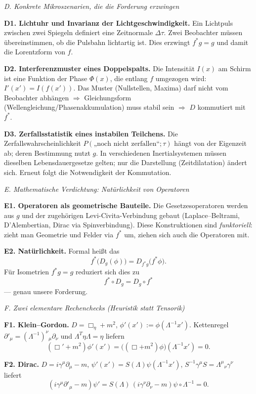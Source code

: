 \documentclass[10pt, letterpaper]{article}
\begin{document}
\bigskip
\emph{D. Konkrete Mikroszenarien, die die Forderung erzwingen}

\textbf{D1. Lichtuhr und Invarianz der Lichtgeschwindigkeit.}
Ein Lichtpuls zwischen zwei Spiegeln definiert eine Zeitnormale $\Delta\tau$. 
Zwei Beobachter müssen übereinstimmen, ob die Pulsbahn lichtartig ist. 
Dies erzwingt $f^*g=g$ und damit die Lorentzform von $f$.

\textbf{D2. Interferenzmuster eines Doppelspalts.}
Die Intensität $I(x)$ am Schirm ist eine Funktion der Phase $\Phi(x)$, die entlang $f$ umgezogen wird:
$I'(x')=I(f(x'))$. 
Das Muster (Nullstellen, Maxima) darf nicht vom Beobachter abhängen $\Rightarrow$ 
Gleichungsform (Wellengleichung/Phasenakkumulation) muss stabil sein $\Rightarrow$ 
$D$ kommutiert mit $f^*$.

\textbf{D3. Zerfallsstatistik eines instabilen Teilchens.}
Die Zerfallswahrscheinlichkeit $P(\text{„noch nicht zerfallen“};\tau)$ hängt von der Eigenzeit ab; 
deren Bestimmung nutzt $g$. 
In verschiedenen Inertialsystemen müssen dieselben Lebensdauergesetze gelten; 
nur die Darstellung (Zeitdilatation) ändert sich. 
Erneut folgt die Notwendigkeit der Kommutation.

\bigskip
\emph{E. Mathematische Verdichtung: Natürlichkeit von Operatoren}

\textbf{E1. Operatoren als geometrische Bauteile.}
Die Gesetzesoperatoren werden aus $g$ und der zugehörigen Levi-Civita-Verbindung gebaut 
(Laplace–Beltrami, D’Alembertian, Dirac via Spinverbindung). 
Diese Konstruktionen sind \emph{funktoriell}: 
zieht man Geometrie und Felder via $f^*$ um, ziehen sich auch die Operatoren mit.

\textbf{E2. Natürlichkeit.}
Formal heißt das
\[
f^*\big(D_g(\phi)\big) = D_{f^*g}\big(f^*\phi\big).
\]
Für Isometrien $f^*g=g$ reduziert sich dies zu
\[
\boxed{\quad f^*\circ D_g = D_g\circ f^* \quad}
\]
— genau unsere Forderung.

\bigskip
\emph{F. Zwei elementare Rechenchecks (Heuristik statt Tensorik)}

\textbf{F1. Klein–Gordon.}
$D=\Box_\eta+m^2$, $\phi'(x'):=\phi(\Lambda^{-1}x')$. 
Kettenregel $\partial'_\mu=(\Lambda^{-1})^\nu{}_\mu\partial_\nu$ und $\Lambda^T\eta\Lambda=\eta$ liefern
\[
(\Box'+m^2)\phi'(x') = \big((\Box+m^2)\phi\big)(\Lambda^{-1}x')=0.
\]

\textbf{F2. Dirac.}
$D=i\gamma^\mu\partial_\mu-m$, $\psi'(x')=S(\Lambda)\psi(\Lambda^{-1}x')$, 
$S^{-1}\gamma^\mu S=\Lambda^\mu{}_\nu\gamma^\nu$ liefert
\[
(i\gamma^\mu\partial'_\mu-m)\psi' = S(\Lambda)\,(i\gamma^\nu\partial_\nu-m)\psi\circ\Lambda^{-1}=0.
\]
\end{document}
